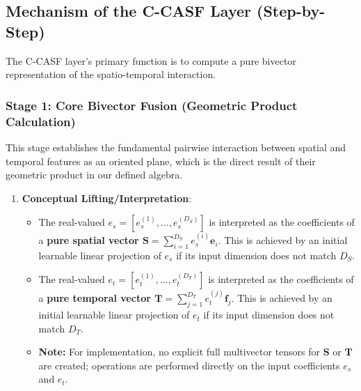 \documentclass[11pt]{article}
\begin{document}
\begin{itemize}
\subsection{Mechanism of the C-CASF Layer (Step-by-Step)}

The C-CASF layer's primary function is to compute a pure bivector representation of the spatio-temporal interaction.

\subsubsection{Stage 1: Core Bivector Fusion (Geometric Product Calculation)}

This stage establishes the fundamental pairwise interaction between spatial and temporal features as an oriented plane, which is the direct result of their geometric product in our defined algebra.

\begin{enumerate}
    \item \textbf{Conceptual Lifting/Interpretation}:
    \begin{itemize}
        \item The real-valued $e_s = [e_s^{(1)}, \dots, e_s^{(D_S)}]$ is interpreted as the coefficients of a \textbf{pure spatial vector $\mathbf{S} = \sum_{i=1}^{D_S} e_s^{(i)} \mathbf{e}_i$}. This is achieved by an initial learnable linear projection of $e_s$ if its input dimension does not match $D_S$.
        \item The real-valued $e_t = [e_t^{(1)}, \dots, e_t^{(D_T)}]$ is interpreted as the coefficients of a \textbf{pure temporal vector $\mathbf{T} = \sum_{j=1}^{D_T} e_t^{(j)} \mathbf{f}_j$}. This is achieved by an initial learnable linear projection of $e_t$ if its input dimension does not match $D_T$.
        \item \textbf{Note:} For implementation, no explicit full multivector tensors for $\mathbf{S}$ or $\mathbf{T}$ are created; operations are performed directly on the input coefficients $e_s$ and $e_t$.
    \end{itemize}


\end{enumerate}
\end{itemize}
\end{document}

